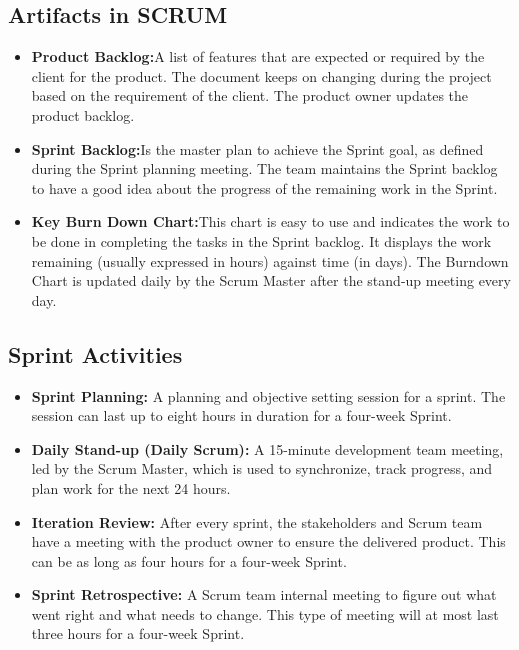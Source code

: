 \subsection{Artifacts in SCRUM}
\begin{itemize}
    \item \textbf{Product Backlog:}A list of features that are expected or required by the client for the product. The document keeps on changing during the project based on the requirement of the client. The product owner updates the product backlog.
    
    \item \textbf{Sprint Backlog:}Is the master plan to achieve the Sprint goal, as defined during the Sprint planning meeting. The team maintains the Sprint backlog to have a good idea about the progress of the remaining work in the Sprint.
    
    \item \textbf{Key Burn Down Chart:}This chart is easy to use and indicates the work to be done in completing the tasks in the Sprint backlog. It displays the work remaining (usually expressed in hours) against time (in days). The Burndown Chart is updated daily by the Scrum Master after the stand-up meeting every day.
\end{itemize}

\subsection{Sprint Activities}
\begin{itemize}
    \item \textbf{Sprint Planning:} A planning and objective setting session for a sprint. The session can last up to eight hours in duration for a four-week Sprint.
    \item \textbf{Daily Stand-up (Daily Scrum):} A 15-minute development team meeting, led by the Scrum Master, which is used to synchronize, track progress, and plan work for the next 24 hours.
    \item \textbf{Iteration Review:} After every sprint, the stakeholders and Scrum team have a meeting with the product owner to ensure the delivered product. This can be as long as four hours for a four-week Sprint.
    \item \textbf{Sprint Retrospective:} A Scrum team internal meeting to figure out what went right and what needs to change. This type of meeting will at most last three hours for a four-week Sprint.
\end{itemize}

